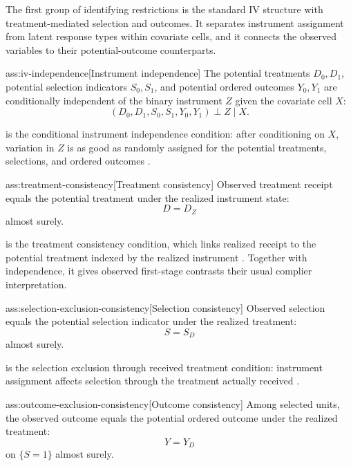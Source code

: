 The first group of identifying restrictions is the standard IV structure with treatment-mediated selection and outcomes. It separates instrument assignment from latent response types within covariate cells, and it connects the observed variables to their potential-outcome counterparts.

\begin{assumptionv}{ass:iv-independence}[Instrument independence]
The potential treatments \(D_0,D_1\), potential selection indicators \(S_0,S_1\), and potential ordered outcomes \(Y_0,Y_1\) are conditionally independent of the binary instrument \(Z\) given the covariate cell \(X\):
\[
(D_0,D_1,S_0,S_1,Y_0,Y_1)\perp Z\mid X.
\]
\end{assumptionv}

 is the conditional instrument independence condition: after conditioning on \(X\), variation in \(Z\) is as good as randomly assigned for the potential treatments, selections, and ordered outcomes \citep{AngristImbensRubin1996}.

\begin{assumptionv}{ass:treatment-consistency}[Treatment consistency]
Observed treatment receipt equals the potential treatment under the realized instrument state:
\[
D=D_Z
\]
almost surely.
\end{assumptionv}

 is the treatment consistency condition, which links realized receipt to the potential treatment indexed by the realized instrument \citep{AngristImbensRubin1996}. Together with independence, it gives observed first-stage contrasts their usual complier interpretation.

\begin{assumptionv}{ass:selection-exclusion-consistency}[Selection consistency]
Observed selection equals the potential selection indicator under the realized treatment:
\[
S=S_D
\]
almost surely.
\end{assumptionv}

 is the selection exclusion through received treatment condition: instrument assignment affects selection through the treatment actually received \citep{KennedyHarrisKeele2019}.

\begin{assumptionv}{ass:outcome-exclusion-consistency}[Outcome consistency]
Among selected units, the observed outcome equals the potential ordered outcome under the realized treatment:
\[
Y=Y_D
\]
on \(\{S=1\}\) almost surely.
\end{assumptionv}


